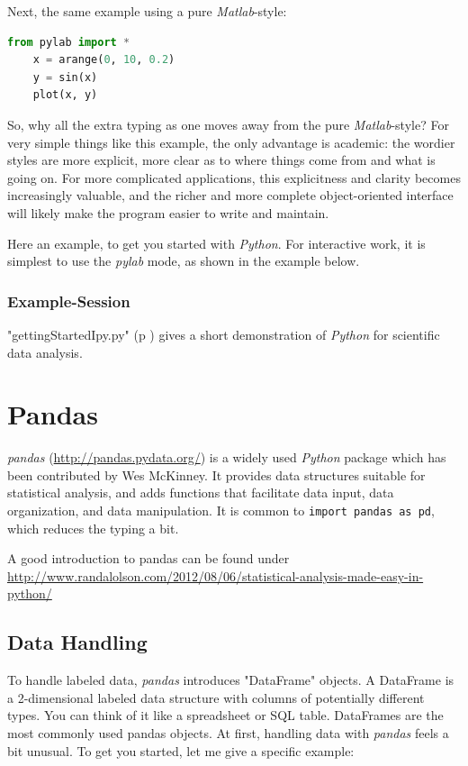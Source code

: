 Next, the same example using a pure \emph{Matlab}-style:

\begin{lstlisting}[language=Python]
    from pylab import *
    x = arange(0, 10, 0.2)
    y = sin(x)
    plot(x, y)
\end{lstlisting}

So, why all the extra typing as one moves away from the pure \emph{Matlab}-style? For very simple things like this example, the only advantage is academic: the wordier styles are more explicit, more clear as to where things come from and what is going on. For more complicated applications, this explicitness and clarity becomes increasingly valuable, and the richer and more complete object-oriented interface will likely make the program easier to write and maintain.

Here an example, to get you started with \emph{Python}. For interactive work, it is simplest to use the \emph{pylab} mode, as shown in the example below.

\subsubsection{Example-Session}

\PyImg "gettingStartedIpy.py" (p \pageref{py:gettingStartedIpy}) gives a short demonstration of \emph{Python} for scientific data analysis.


\section{Pandas}

\emph{pandas} (\url{http://pandas.pydata.org/}) is a widely used \emph{Python} package which has been contributed by Wes McKinney. It provides data structures suitable for statistical analysis, and adds functions that facilitate
data input, data organization, and data manipulation. It is common to \lstinline{import pandas as pd}, which reduces the typing a bit.

A good introduction to pandas can be found under
\url{http://www.randalolson.com/2012/08/06/statistical-analysis-made-easy-in-python/}

\subsection{Data Handling}


To handle labeled data, \emph{pandas} introduces "DataFrame" objects. A DataFrame is a 2-dimensional labeled data structure with columns of potentially different types. You can think of it like a spreadsheet or SQL table. DataFrames are the most commonly used pandas objects.
At first, handling data with \emph{pandas} feels a bit unusual. To get you started, let me give a specific example:

